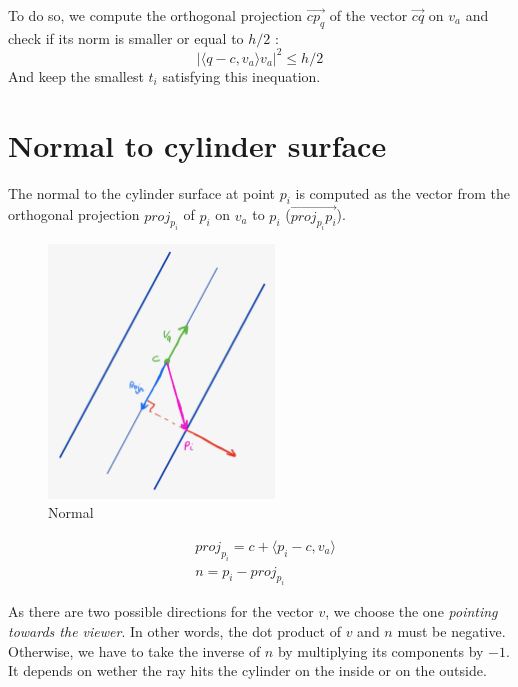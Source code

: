 \documentclass{article}
\begin{document}
To do so, we compute the orthogonal projection $\overrightarrow{cp_q}$ of the vector $\overrightarrow{cq}$ on $v_a$ and check if its norm is smaller or equal to $h/2$ :
$$|\langle q-c, v_a\rangle v_a|^2 \leq h/2$$
And keep the smallest $t_i$ satisfying this inequation.

\section{Normal to cylinder surface}

The normal to the cylinder surface at point $p_i$ is computed as the vector from the orthogonal projection $proj_{p_i}$ of $p_i$ on $v_a$ to $p_i$ ($\overrightarrow{proj_{p_i}p_i}$).

\begin{figure}[h]
\centering
\includegraphics[width=6cm]{res/Normal_sketch.jpeg}
\caption{Normal}
\end{figure}


\begin{align*}
    &proj_{p_i} = c + \langle p_i-c, v_a \rangle \\
    &n = p_i - proj_{p_i}
\end{align*}

As there are two possible directions for the vector $v$, we choose the one \textit{pointing towards the viewer}. In other words, the dot product of $v$ and $n$ must be negative. Otherwise, we have to take the inverse of $n$ by multiplying its components by $-1$. It depends on wether the ray hits the cylinder on the inside or on the outside.
\end{document}
